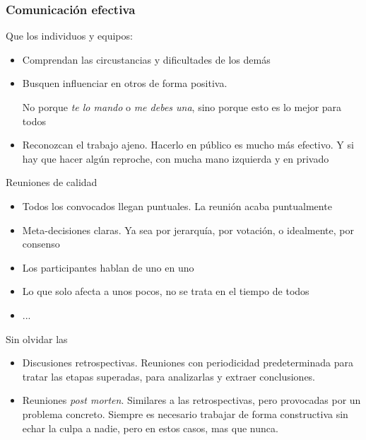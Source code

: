 \documentclass[ucs]{beamer}
\begin{document}
\begin{frame}[fragile]
\frametitle{Comunicación efectiva}
Que los individuos y equipos:
\begin{itemize}
\item

Comprendan las circustancias y dificultades de los demás

\item
Busquen influenciar en otros de forma positiva.

No porque \emph{te lo mando} o \emph{me debes una}, sino porque
esto es lo mejor para todos

\item
Reconozcan  el trabajo ajeno. Hacerlo en público es mucho más
efectivo. Y si hay que hacer algún reproche, con mucha
mano izquierda y en privado

\end{itemize}
\end{frame}

\begin{frame}[fragile]

Reuniones de calidad

\begin{itemize}
\item
Todos los convocados llegan puntuales. La reunión acaba puntualmente

\item
Meta-decisiones claras. Ya sea por
jerarquía, por votación, o idealmente, por consenso

\item
Los participantes hablan de uno en uno

\item
Lo que solo afecta a unos pocos, no se trata en el tiempo de todos

\item
...

\end{itemize}

Sin olvidar las

\begin{itemize}
\item
Discusiones retrospectivas.
Reuniones con periodicidad predeterminada para tratar
las etapas superadas, para analizarlas
y extraer conclusiones.

\item
Reuniones \emph{post morten}. Similares a las retrospectivas,
pero provocadas por un problema concreto.
Siempre es necesario trabajar de forma constructiva  sin echar la culpa a nadie,
pero en estos casos, mas que nunca.
\end{itemize}
\end{frame}
\end{document}
